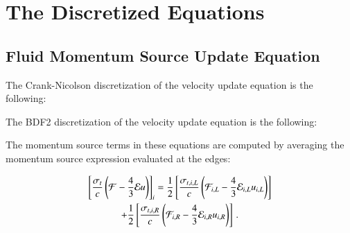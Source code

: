 \section{The Discretized Equations}



\subsection{Fluid Momentum Source Update Equation}
The Crank-Nicolson discretization of the velocity update equation is the
following:


The BDF2 discretization of the velocity update equation is the
following:


The momentum source terms in these equations are computed by averaging the
momentum source expression evaluated at the edges:

\begin{multline}
   \left[\frac{\sigma_t}{c}\left(\mathcal{F} - \frac{4}{3}\mathcal{E} u\right)\right]_i =
   \frac{1}{2}\left[\frac{\sigma_{t,i,L}}{c}\left(\mathcal{F}_{i,L} - \frac{4}{3}\mathcal{E}_{i,L} u_{i,L}\right)\right]\\
   + \frac{1}{2}\left[\frac{\sigma_{t,i,R}}{c}\left(\mathcal{F}_{i,R} - \frac{4}{3}\mathcal{E}_{i,R} u_{i,R}\right)\right]
   \, .
\end{multline}

